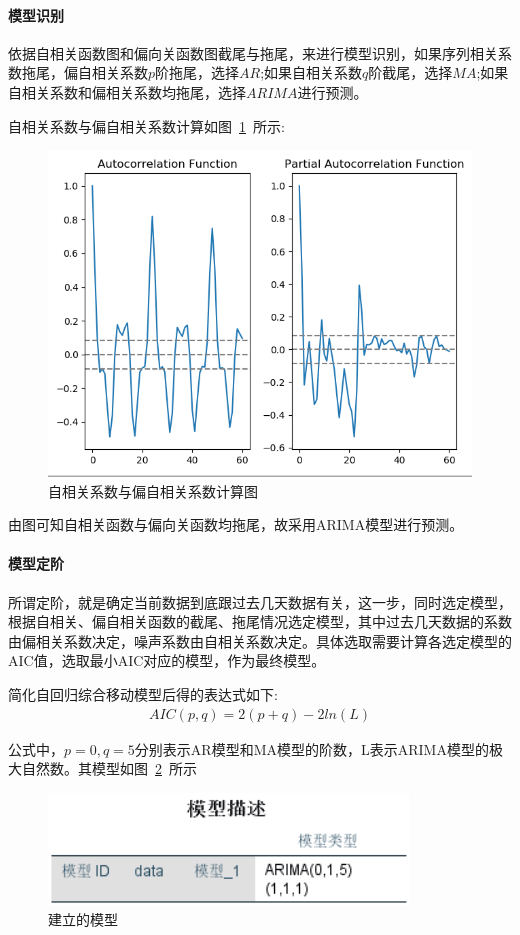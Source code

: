 \documentclass{whutmod}
\begin{document}
	\paragraph{模型识别} 
	
依据自相关函数图和偏向关函数图截尾与拖尾，来进行模型识别，如果序列相关系数拖尾，偏自相关系数$p$阶拖尾，选择$AR$;如果自相关系数$q$阶截尾，选择$MA$;如果自相关系数和偏相关系数均拖尾，选择$ARIMA$进行预测。\parencite{wang2015improving}
	
	自相关系数与偏自相关系数计算如图~\ref{img005}~所示:
	\begin{figure}[H]
		\centering
		\includegraphics[width=.6\textwidth]{figures/5.png}
		\caption{自相关系数与偏自相关系数计算图}\label{img005}
	\end{figure}
由图可知自相关函数与偏向关函数均拖尾，故采用ARIMA模型进行预测。
	
	\paragraph{模型定阶} 所谓定阶，就是确定当前数据到底跟过去几天数据有关，这一步，同时选定模型，根据自相关、偏自相关函数的截尾、拖尾情况选定模型，其中过去几天数据的系数由偏相关系数决定，噪声系数由自相关系数决定\parencite{zhang2019prediction}。具体选取需要计算各选定模型的AIC值，选取最小AIC对应的模型，作为最终模型。
	
	简化自回归综合移动模型后得的表达式如下:
	\begin{gather}
	AIC(p,q) = 2(p+q)-2ln(L)
	\end{gather}
	
	公式中，$p=0,q=5$分别表示AR模型和MA模型的阶数，L表示ARIMA模型的极大自然数。其模型如图~\ref{img009}~所示
	\begin{figure}[H]
		\centering
		\includegraphics[width=.5\textwidth]{figures/9.png}
		\caption{建立的模型}\label{img009}
	\end{figure}
\end{document}
